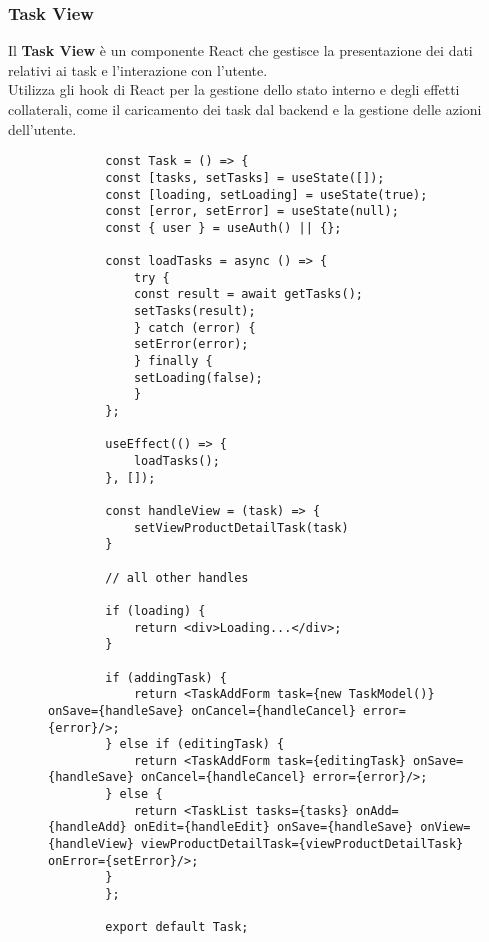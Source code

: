 \subsubsection{Task View}
Il \textbf{Task View} è un componente React che gestisce la presentazione dei dati relativi ai task e l'interazione con l'utente.\\
Utilizza gli hook di React per la gestione dello stato interno e degli effetti collaterali, come il caricamento dei task dal backend e la gestione delle azioni dell'utente.
\begin{figure}[H]
    \centering
    \begin{verbatim}
        const Task = () => {
        const [tasks, setTasks] = useState([]);
        const [loading, setLoading] = useState(true);
        const [error, setError] = useState(null);
        const { user } = useAuth() || {};

        const loadTasks = async () => {
            try {
            const result = await getTasks();
            setTasks(result);
            } catch (error) {
            setError(error);
            } finally {
            setLoading(false);
            }
        };

        useEffect(() => {
            loadTasks();
        }, []);
        
        const handleView = (task) => {
            setViewProductDetailTask(task)
        }

        // all other handles

        if (loading) {
            return <div>Loading...</div>;
        }

        if (addingTask) {
            return <TaskAddForm task={new TaskModel()} onSave={handleSave} onCancel={handleCancel} error={error}/>;
        } else if (editingTask) {
            return <TaskAddForm task={editingTask} onSave={handleSave} onCancel={handleCancel} error={error}/>;
        } else {
            return <TaskList tasks={tasks} onAdd={handleAdd} onEdit={handleEdit} onSave={handleSave} onView={handleView} viewProductDetailTask={viewProductDetailTask} onError={setError}/>;
        }
        };

        export default Task;
\end{verbatim}
\end{figure}


